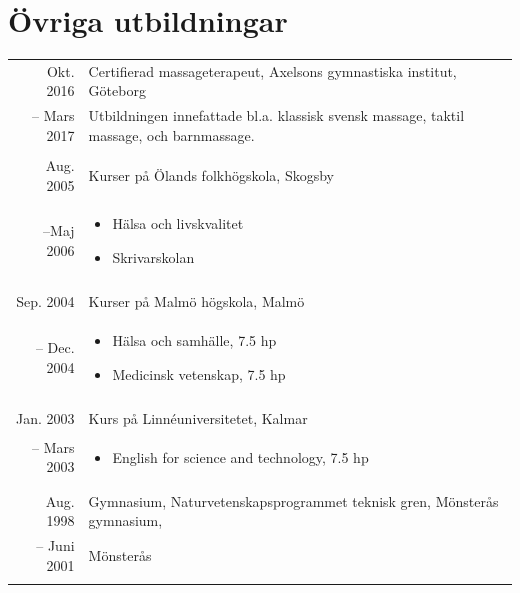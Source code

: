 \documentclass[11pt,a4paper]{article}
\begin{document}
\section{Övriga utbildningar}
\begin{tabularx}{\textwidth}{r|X}
	
	Okt. 2016& Certifierad massageterapeut, Axelsons gymnastiska institut, Göteborg\\
	-- Mars 2017& \footnotesize{Utbildningen innefattade bl.a. klassisk svensk massage, taktil massage, och barnmassage.} \\
	\multicolumn{2}{c}{} \\
	
	Aug. 2005& Kurser på Ölands folkhögskola, Skogsby \\
	--Maj 2006&\footnotesize{\vspace{-5pt}
		\begin{itemize}[leftmargin=10pt, topsep=-12.5pt]
			\item Hälsa och livskvalitet
			\item Skrivarskolan
		\end{itemize}\vspace{-30pt} 
	}\\
	\multicolumn{2}{c}{} \\
	
	Sep. 2004& Kurser på Malmö högskola, Malmö\\
	-- Dec. 2004&\footnotesize{\vspace{-5pt}
		\begin{itemize}[leftmargin=10pt, topsep=-12.5pt]
			\item Hälsa och samhälle, 7.5 hp
			\item Medicinsk vetenskap, 7.5 hp
		\end{itemize}\vspace{-30pt} 
	}\\
	\multicolumn{2}{c}{} \\	
		
	Jan. 2003& Kurs på Linnéuniversitetet, Kalmar\\
	-- Mars 2003&\footnotesize{\vspace{-5pt}
		\begin{itemize}[leftmargin=10pt, topsep=-12.5pt]
			\item English for science and technology, 7.5 hp
		\end{itemize}\vspace{-30pt} 
	}\\
	
	\multicolumn{2}{c}{} \\
	
	Aug. 1998& Gymnasium, Naturvetenskapsprogrammet teknisk gren, Mönsterås gymnasium,\\
	-- Juni 2001&Mönsterås\\
	\multicolumn{2}{c}{} \\
\end{tabularx}
\end{document}
